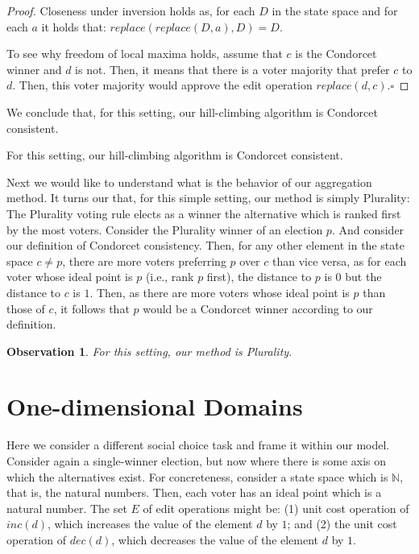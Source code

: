 \documentclass[sigconf]{aamas}  %
\newtheorem{observation}{Observation}
\newcommand{\qqed}{\hfill$\square$}
\begin{document}
\begin{proof}
%
Closeness under inversion holds as, for each $D$ in the state space and for each $a$ it holds that:
  $replace(replace(D, a), D) = D$.
  
To see why freedom of local maxima holds, assume that $c$ is the Condorcet winner and $d$ is not. Then, it means that there is a voter majority that prefer $c$ to $d$. Then, this voter majority would approve the edit operation $replace(d, c)$.\qqed
%
\end{proof}

We conclude that, for this setting, our hill-climbing algorithm is Condorcet consistent.

\begin{corollary}
  For this setting, our hill-climbing algorithm is Condorcet consistent.
\end{corollary}

Next we would like to understand what is the behavior of our aggregation method. It turns our that, for this simple setting, our method is simply Plurality:
  The Plurality voting rule elects as a winner the alternative which is ranked first by the most voters.
Consider the Plurality winner of an election $p$. And consider our definition of Condorcet consistency. Then, for any other element in the state space $c \neq p$, there are more voters preferring $p$ over $c$ than vice versa, as for each voter whose ideal point is $p$ (i.e., rank $p$ first), the distance to $p$ is $0$ but the distance to $c$ is $1$. Then, as there are more voters whose ideal point is $p$ than those of $c$, it follows that $p$ would be a Condorcet winner according to our definition.

\begin{observation}
  For this setting, our method is Plurality.
\end{observation}


\section{One-dimensional Domains}

Here we consider a different social choice task and frame it within our model. Consider again a single-winner election, but now where there is some axis on which the alternatives exist. For concreteness, consider a state space which is $\mathbb{N}$, that is, the natural numbers. Then, each voter has an ideal point which is a natural number. The set $E$ of edit operations might be:
  (1) unit cost operation of $inc(d)$, which increases the value of the element $d$ by $1$;
  and
  (2) the unit cost operation of $dec(d)$, which decreases the value of the element $d$ by $1$.
\end{document}
